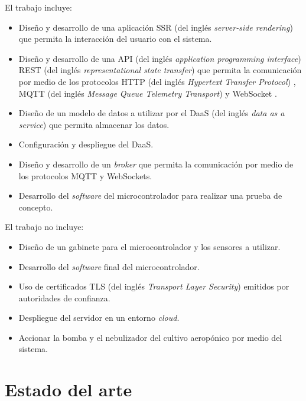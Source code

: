 El trabajo incluye:
\begin{itemize}
	\item Diseño y desarrollo de una aplicación SSR (del inglés \textit{server-side rendering}) \citep{WEBSITE:SSR} que permita la interacción del usuario con el sistema.
	\item Diseño y desarrollo de una API (del inglés \textit{application programming interface}) \citep{WEBSITE:API} REST (del inglés \textit{representational state transfer}) \citep{WEBSITE:REST} que permita la comunicación por medio de los protocolos HTTP (del inglés \textit{Hypertext Transfer Protocol}) \citep{WEBSITE:HTTP}, MQTT (del inglés \textit{Message Queue Telemetry Transport}) \citep{WEBSITE:MQTT} y WebSocket \citep{WEBSITE:WEBSOCKET}.
	\item Diseño de un modelo de datos a utilizar por el DaaS (del inglés \textit{data as a service}) \citep{WEBSITE:DAAS} que permita almacenar los datos.
	\item Configuración y despliegue del DaaS.
	\item Diseño y desarrollo de un \textit{broker} que permita la comunicación por medio de los protocolos MQTT y WebSockets.
	\item Desarrollo del \emph{software} del microcontrolador para realizar una prueba de concepto.
\end{itemize}

El trabajo no incluye:
\begin{itemize}
	\item Diseño de un gabinete para el microcontrolador y los sensores a utilizar.
	\item Desarrollo del \emph{software} final del microcontrolador.
	\item Uso de certificados TLS (del inglés \textit{Transport Layer Security}) \citep{WEBSITE:TLS} emitidos por autoridades de confianza.
	\item Despliegue del servidor en un entorno \textit{cloud}.
	\item Accionar la bomba y el nebulizador del cultivo aeropónico por medio del sistema.
\end{itemize}


\section{Estado del arte}

